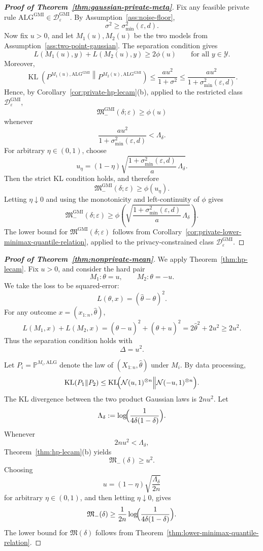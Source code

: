\documentclass[journal]{IEEEtran}
\newcommand{\ALG}{\mathrm{ALG}}
\newcommand{\KL}{\operatorname{KL}}
\begin{document}
\begin{proof}[\textbf{Proof of Theorem~\ref{thm:gaussian-private-meta}}]
Fix any feasible private rule
\(\ALG^{\mathrm{GMI}}\in\mathcal D_\varepsilon^{\mathrm{GMI}}\). By
Assumption~\ref{ass:noise-floor},
\[
\sigma^2\ge \sigma_{\min}^2(\varepsilon,d).
\]
Now fix \(u>0\), and let \(M_1(u),M_2(u)\) be the two models from
Assumption~\ref{ass:two-point-gaussian}. The separation condition gives
\[
L(M_1(u),y)+L(M_2(u),y)\ge 2\phi(u)
\qquad
\text{for all }y\in\mathcal Y.
\]
Moreover,
\[
\KL\!\left(
P^{M_1(u),\ALG^{\mathrm{GMI}}}\middle\|P^{M_2(u),\ALG^{\mathrm{GMI}}}
\right)
\le
\frac{a u^2}{1+\sigma^2}
\le
\frac{a u^2}{1+\sigma_{\min}^2(\varepsilon,d)}.
\]
Hence, by Corollary~\ref{cor:private-hp-lecam}(b), applied to the restricted class
\(\mathcal D_\varepsilon^{\mathrm{GMI}}\),
\[
\mathfrak M^{\mathrm{GMI}}_-(\delta;\varepsilon)\ge \phi(u)
\]
whenever
\[
\frac{a u^2}{1+\sigma_{\min}^2(\varepsilon,d)}
<
\Lambda_\delta.
\]
For arbitrary \(\eta\in(0,1)\), choose
\[
u_\eta
=
(1-\eta)
\sqrt{
\frac{1+\sigma_{\min}^2(\varepsilon,d)}{a}\,
\Lambda_\delta
}.
\]
Then the strict KL condition holds, and therefore
\[
\mathfrak M^{\mathrm{GMI}}_-(\delta;\varepsilon)
\ge
\phi(u_\eta).
\]
Letting \(\eta\downarrow0\) and using the monotonicity and left-continuity of \(\phi\) gives
\[
\mathfrak M^{\mathrm{GMI}}_-(\delta;\varepsilon)
\ge
\phi\!\left(
\sqrt{
\frac{1+\sigma_{\min}^2(\varepsilon,d)}{a}\,
\Lambda_\delta
}
\right).
\]
The lower bound for \(\mathfrak M^{\mathrm{GMI}}(\delta;\varepsilon)\) follows from
Corollary~\ref{cor:private-lower-minimax-quantile-relation}, applied to the privacy-constrained
class \(\mathcal D_\varepsilon^{\mathrm{GMI}}\).
\end{proof}

\begin{proof}[\textbf{Proof of Theorem~\ref{thm:nonprivate-mean}}]
We apply Theorem~\ref{thm:hp-lecam}. Fix \(u>0\), and consider the hard pair
\[
M_1:\theta=u,
\qquad
M_2:\theta=-u.
\]
We take the loss to be squared-error:
\[
L(\theta,x)=(\hat\theta-\theta)^2.
\]
For any outcome \(x=(x_{1:n},\hat\theta)\),
\[
L(M_1,x)+L(M_2,x)
=
(\hat\theta-u)^2+(\hat\theta+u)^2
=
2\hat\theta^2+2u^2
\ge 2u^2.
\]
Thus the separation condition holds with
\[
\Delta=u^2.
\]

Let \(P_i=\mathbb P^{M_i,\ALG}\) denote the law of
\((X_{1:n},\hat\theta)\) under \(M_i\). By data processing,
\[
\KL(P_1\|P_2)
\le
\KL\!\Bigl(
\mathcal N(u,1)^{\otimes n}
\Big\|
\mathcal N(-u,1)^{\otimes n}
\Bigr).
\]
The KL divergence between the two product Gaussian laws is
\(
2nu^2.
\)
Let
\[
\Lambda_\delta
:=
\log\!\Bigl(\frac{1}{4\delta(1-\delta)}\Bigr).
\]
Whenever
\[
2nu^2<\Lambda_\delta,
\]
Theorem~\ref{thm:hp-lecam}(b) yields
\[
\mathfrak M_-(\delta)\ge u^2.
\]
Choosing
\[
u=(1-\eta)\sqrt{\frac{\Lambda_\delta}{2n}}
\]
for arbitrary \(\eta\in(0,1)\), and then letting \(\eta\downarrow0\), gives
\[
\mathfrak M_-(\delta)
\ge
\frac{1}{2n}
\log\!\Bigl(\frac{1}{4\delta(1-\delta)}\Bigr).
\]
The lower bound for \(\mathfrak M(\delta)\) follows from
Theorem~\ref{thm:lower-minimax-quantile-relation}.
\end{proof}
\end{document}
